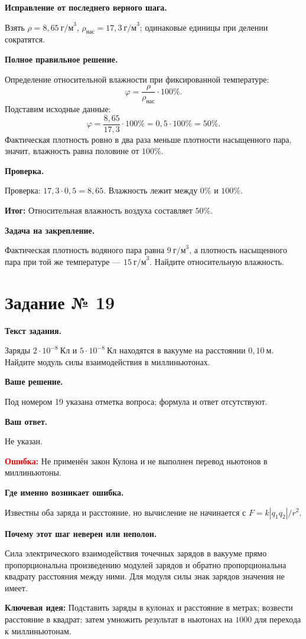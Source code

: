\documentclass[11pt,a4paper]{article}
\newcommand{\reviewblock}[2]{\par\medskip\noindent\textbf{#1}\par\noindent#2\par}
\newcommand{\errorblock}[1]{\par\medskip\noindent\textcolor{red}{\textbf{Ошибка:}} #1\par}
\newcommand{\ideablock}[1]{\par\medskip\noindent\textcolor{blue!60!black}{\textbf{Ключевая идея:}} #1\par}
\newcommand{\resultblock}[1]{\par\medskip\noindent\textcolor{teal!60!black}{\textbf{Итог:}} #1\par}
\begin{document}
\reviewblock{Исправление от последнего верного шага.}{Взять $\rho=8{,}65\ \text{г/м}^3$, $\rho_{\text{нас}}=17{,}3\ \text{г/м}^3$; одинаковые единицы при делении сократятся.}

\reviewblock{Полное правильное решение.}{Определение относительной влажности при фиксированной температуре:
\[\varphi=\frac{\rho}{\rho_{\text{нас}}}\cdot100\%.\]
Подставим исходные данные:
\[\varphi=\frac{8{,}65}{17{,}3}\cdot100\%=0{,}5\cdot100\%=50\%.\]
Фактическая плотность ровно в два раза меньше плотности насыщенного пара, значит, влажность равна половине от $100\%$.}

\reviewblock{Проверка.}{Проверка: $17{,}3\cdot0{,}5=8{,}65$. Влажность лежит между $0\%$ и $100\%$.}

\resultblock{Относительная влажность воздуха составляет $50\%$.}

\reviewblock{Задача на закрепление.}{Фактическая плотность водяного пара равна $9\ \text{г/м}^3$, а плотность насыщенного пара при той же температуре --- $15\ \text{г/м}^3$. Найдите относительную влажность.}
\newpage
{}\label{task:19}

\section*{Задание № 19}

\reviewblock{Текст задания.}{Заряды $2\cdot10^{-8}\ \text{Кл}$ и $5\cdot10^{-8}\ \text{Кл}$ находятся в вакууме на расстоянии $0{,}10\ \text{м}$. Найдите модуль силы взаимодействия в миллиньютонах.}

\reviewblock{Ваше решение.}{Под номером 19 указана отметка вопроса; формула и ответ отсутствуют.}

\reviewblock{Ваш ответ.}{Не указан.}

\errorblock{Не применён закон Кулона и не выполнен перевод ньютонов в миллиньютоны.}

\reviewblock{Где именно возникает ошибка.}{Известны оба заряда и расстояние, но вычисление не начинается с $F=k|q_1q_2|/r^2$.}

\reviewblock{Почему этот шаг неверен или неполон.}{Сила электрического взаимодействия точечных зарядов в вакууме прямо пропорциональна произведению модулей зарядов и обратно пропорциональна квадрату расстояния между ними. Для модуля силы знак зарядов значения не имеет.}

\ideablock{Подставить заряды в кулонах и расстояние в метрах; возвести расстояние в квадрат; затем умножить результат в ньютонах на $1000$ для перехода к миллиньютонам.}
\end{document}
